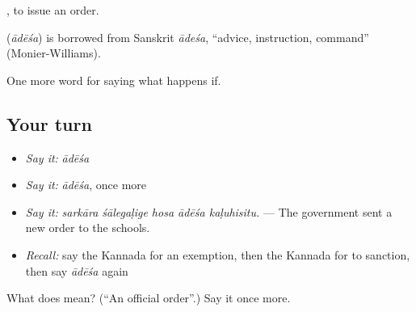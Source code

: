  , to issue an order.

\begin{cousinweb}
\textbf{} (\emph{ādēśa}) is borrowed from Sanskrit \emph{ādeśa}, \textquotedblleft{}advice, instruction, command\textquotedblright{} (Monier-Williams).
\end{cousinweb}

\begin{grammarlens}[title={What you've built}]
One more word for saying what happens if.
\end{grammarlens}

\subsection*{Your turn}
\begin{itemize}
\raggedright
  \item \emph{Say it:} \emph{ādēśa}
  \item \emph{Say it:} \emph{ādēśa}, once more
  \item \emph{Say it:} \emph{sarkāra śālegaḷige hosa ādēśa kaḷuhisitu.} — The government sent a new order to the schools.
  \item \emph{Recall:} say the Kannada for an exemption, then the Kannada for to sanction, then say \emph{ādēśa} again
\end{itemize}

\begin{tcolorbox}[breakable,colback=teal!4,colframe=teal!35!black,title={Before you move on}]
What does  mean? (\textquotedblleft{}An official order\textquotedblright{}.) Say it once more.
\end{tcolorbox}

